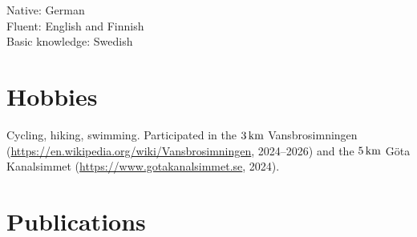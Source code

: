 \documentclass{article}
\newcommand{\km}{\,{\rm km}}
\begin{document}
\noindent
Native: German\\
Fluent: English and Finnish\\
Basic knowledge: Swedish\\

\section*{Hobbies}

Cycling, hiking, swimming.
Participated in the $3\km$ Vansbrosimningen
(\url{https://en.wikipedia.org/wiki/Vansbrosimningen}, 2024--2026)
and the $5\km$ G\"ota Kanalsimmet (\url{https://www.gotakanalsimmet.se}, 2024).

\vspace{8mm}

\section*{Publications}

%
\end{document}
